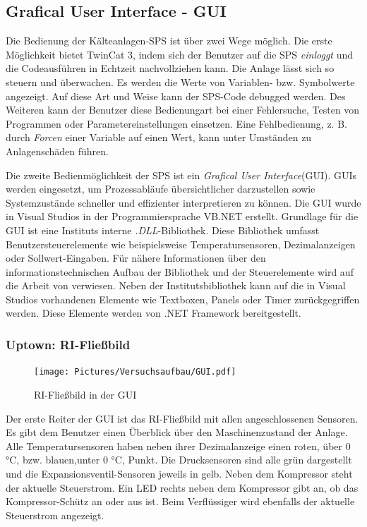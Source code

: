 \subsection{Grafical User Interface - GUI}
\label{subsec:GUI}

Die Bedienung der Kälteanlagen-SPS ist über zwei Wege möglich. Die erste Möglichkeit bietet TwinCat 3, indem sich der Benutzer auf die SPS \textit{einloggt} und die Codeausführen in Echtzeit nachvollziehen kann. Die Anlage lässt sich so steuern und überwachen. Es werden die Werte von Variablen- bzw. Symbolwerte angezeigt. Auf diese Art und Weise kann der SPS-Code debugged werden. 
Des Weiteren kann der Benutzer diese Bedienungart bei einer Fehlersuche, Testen von Programmen oder Parametereinstellungen einsetzen. 
Eine Fehlbedienung, z. B. durch \textit{Forcen} einer Variable auf einen Wert, kann unter Umständen zu Anlagenschäden führen. 

Die zweite Bedienmöglichkeit der SPS ist ein \textit{Grafical User Interface}(GUI). GUIs werden eingesetzt, um Prozessabläufe übersichtlicher darzustellen sowie Systemzustände schneller und effizienter interpretieren zu können. Die GUI wurde in Visual Studios in der Programmiersprache VB.NET erstellt. Grundlage für die GUI ist eine Instituts interne \textit{.DLL}-Bibliothek. Diese Bibliothek umfasst Benutzersteuerelemente wie beispielsweise Temperatursensoren, Dezimalanzeigen oder Sollwert-Eingaben. Für nähere Informationen über den informationstechnischen Aufbau der Bibliothek und der Steuerelemente wird auf die Arbeit von \citep{Nuerenberg2015} verwiesen. 
Neben der Institutsbibliothek kann auf die in Visual Studios vorhandenen Elemente wie Textboxen, Panels oder Timer zurückgegriffen werden. Diese Elemente werden von .NET Framework bereitgestellt.  

\subsubsection*{Uptown: RI-Fließbild}

\begin{figure}[htb]
\centering		\texttt{[image: Pictures/Versuchsaufbau/GUI.pdf]}
\caption{RI-Fließbild in der GUI}
\label{fig:RI}
\end{figure}

Der erste Reiter der GUI ist das RI-Fließbild mit allen angeschlossenen Sensoren. Es gibt dem Benutzer einen Überblick über den Maschinenzustand der Anlage. Alle Temperatursensoren haben neben ihrer Dezimalanzeige einen roten, über 0 °C, bzw. blauen,unter 0 °C, Punkt. Die Drucksensoren sind alle grün dargestellt und die Expansionsventil-Sensoren jeweils in gelb. Neben dem Kompressor steht der aktuelle Steuerstrom. Ein LED rechts neben dem Kompressor gibt an, ob das Kompressor-Schütz an oder aus ist. 
Beim Verflüssiger wird ebenfalls der aktuelle Steuerstrom angezeigt. 

